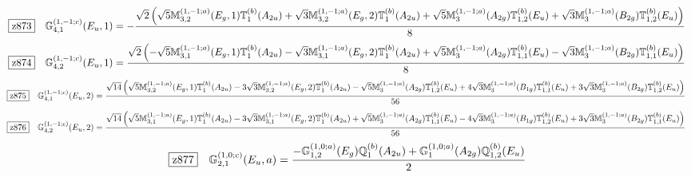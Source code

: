 \documentclass[fleqn,10pt,landscape]{jsarticle}
\begin{document}
\begin{dmath*}
\hspace*{3mm}\fbox{z873}\quad \mathbb{G}_{4,1}^{(1,-1;c)}(E_{u},1)=- \frac{\sqrt{2} \left(\sqrt{5} \mathbb{M}_{3,2}^{(1,-1;a)}(E_{g},1) \mathbb{T}_{1}^{(b)}(A_{2u}) + \sqrt{3} \mathbb{M}_{3,2}^{(1,-1;a)}(E_{g},2) \mathbb{T}_{1}^{(b)}(A_{2u}) + \sqrt{5} \mathbb{M}_{3}^{(1,-1;a)}(A_{2g}) \mathbb{T}_{1,2}^{(b)}(E_{u}) + \sqrt{3} \mathbb{M}_{3}^{(1,-1;a)}(B_{2g}) \mathbb{T}_{1,2}^{(b)}(E_{u})\right)}{8}
\end{dmath*}
\begin{dmath*}
\hspace*{3mm}\fbox{z874}\quad \mathbb{G}_{4,2}^{(1,-1;c)}(E_{u},1)=\frac{\sqrt{2} \left(- \sqrt{5} \mathbb{M}_{3,1}^{(1,-1;a)}(E_{g},1) \mathbb{T}_{1}^{(b)}(A_{2u}) - \sqrt{3} \mathbb{M}_{3,1}^{(1,-1;a)}(E_{g},2) \mathbb{T}_{1}^{(b)}(A_{2u}) + \sqrt{5} \mathbb{M}_{3}^{(1,-1;a)}(A_{2g}) \mathbb{T}_{1,1}^{(b)}(E_{u}) - \sqrt{3} \mathbb{M}_{3}^{(1,-1;a)}(B_{2g}) \mathbb{T}_{1,1}^{(b)}(E_{u})\right)}{8}
\end{dmath*}
\begin{dmath*}
\hspace*{3mm}\fbox{z875}\quad \mathbb{G}_{4,1}^{(1,-1;c)}(E_{u},2)=\frac{\sqrt{14} \left(\sqrt{5} \mathbb{M}_{3,2}^{(1,-1;a)}(E_{g},1) \mathbb{T}_{1}^{(b)}(A_{2u}) - 3 \sqrt{3} \mathbb{M}_{3,2}^{(1,-1;a)}(E_{g},2) \mathbb{T}_{1}^{(b)}(A_{2u}) - \sqrt{5} \mathbb{M}_{3}^{(1,-1;a)}(A_{2g}) \mathbb{T}_{1,2}^{(b)}(E_{u}) + 4 \sqrt{3} \mathbb{M}_{3}^{(1,-1;a)}(B_{1g}) \mathbb{T}_{1,1}^{(b)}(E_{u}) + 3 \sqrt{3} \mathbb{M}_{3}^{(1,-1;a)}(B_{2g}) \mathbb{T}_{1,2}^{(b)}(E_{u})\right)}{56}
\end{dmath*}
\begin{dmath*}
\hspace*{3mm}\fbox{z876}\quad \mathbb{G}_{4,2}^{(1,-1;c)}(E_{u},2)=\frac{\sqrt{14} \left(\sqrt{5} \mathbb{M}_{3,1}^{(1,-1;a)}(E_{g},1) \mathbb{T}_{1}^{(b)}(A_{2u}) - 3 \sqrt{3} \mathbb{M}_{3,1}^{(1,-1;a)}(E_{g},2) \mathbb{T}_{1}^{(b)}(A_{2u}) + \sqrt{5} \mathbb{M}_{3}^{(1,-1;a)}(A_{2g}) \mathbb{T}_{1,1}^{(b)}(E_{u}) - 4 \sqrt{3} \mathbb{M}_{3}^{(1,-1;a)}(B_{1g}) \mathbb{T}_{1,2}^{(b)}(E_{u}) + 3 \sqrt{3} \mathbb{M}_{3}^{(1,-1;a)}(B_{2g}) \mathbb{T}_{1,1}^{(b)}(E_{u})\right)}{56}
\end{dmath*}
\begin{dmath*}
\hspace*{3mm}\fbox{z877}\quad \mathbb{G}_{2,1}^{(1,0;c)}(E_{u},a)=\frac{- \mathbb{G}_{1,2}^{(1,0;a)}(E_{g}) \mathbb{Q}_{1}^{(b)}(A_{2u}) + \mathbb{G}_{1}^{(1,0;a)}(A_{2g}) \mathbb{Q}_{1,2}^{(b)}(E_{u})}{2}
\end{dmath*}
\end{document}
